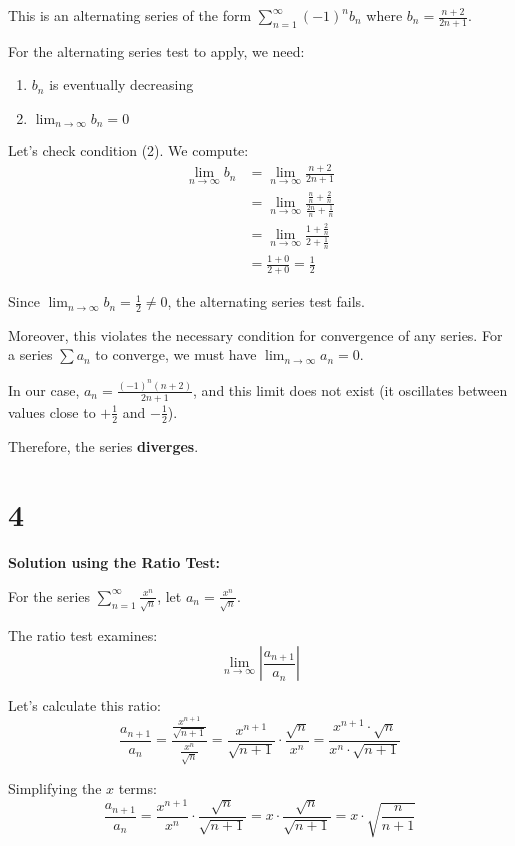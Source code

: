 \documentclass[12pt,a4paper]{article}
\theoremstyle{definition}
\theoremstyle{remark}
\begin{document}
This is an alternating series of the form $\sum_{n=1}^{\infty} (-1)^n b_n$ where $b_n = \frac{n+2}{2n+1}$.

For the alternating series test to apply, we need:
\begin{enumerate}
    \item $b_n$ is eventually decreasing
    \item $\lim_{n \to \infty} b_n = 0$
\end{enumerate}

Let's check condition (2). We compute:
\begin{align*}
    \lim_{n \to \infty} b_n &= \lim_{n \to \infty} \frac{n+2}{2n+1} \\
    &= \lim_{n \to \infty} \frac{\frac{n}{n} + \frac{2}{n}}{\frac{2n}{n} + \frac{1}{n}} \\
    &= \lim_{n \to \infty} \frac{1 + \frac{2}{n}}{2 + \frac{1}{n}} \\
    &= \frac{1 + 0}{2 + 0} = \frac{1}{2}
\end{align*}

Since $\lim_{n \to \infty} b_n = \frac{1}{2} \neq 0$, the alternating series test fails.

Moreover, this violates the necessary condition for convergence of any series. For a series $\sum a_n$ to converge, we must have $\lim_{n \to \infty} a_n = 0$.

In our case, $a_n = \frac{(-1)^n (n+2)}{2n+1}$, and this limit does not exist (it oscillates between values close to $+\frac{1}{2}$ and $-\frac{1}{2}$).

Therefore, the series \textbf{diverges}.


\section*{4}

\textbf{Solution using the Ratio Test:}

For the series $\sum_{n=1}^{\infty} \frac{x^n}{\sqrt{n}}$, let $a_n = \frac{x^n}{\sqrt{n}}$.

The ratio test examines:
$$\lim_{n \to \infty} \left|\frac{a_{n+1}}{a_n}\right|$$

Let's calculate this ratio:
$$\frac{a_{n+1}}{a_n} = \frac{\frac{x^{n+1}}{\sqrt{n+1}}}{\frac{x^n}{\sqrt{n}}} = \frac{x^{n+1}}{\sqrt{n+1}} \cdot \frac{\sqrt{n}}{x^n} = \frac{x^{n+1} \cdot \sqrt{n}}{x^n \cdot \sqrt{n+1}}$$

Simplifying the $x$ terms:
$$\frac{a_{n+1}}{a_n} = \frac{x^{n+1}}{x^n} \cdot \frac{\sqrt{n}}{\sqrt{n+1}} = x \cdot \frac{\sqrt{n}}{\sqrt{n+1}} = x \cdot \sqrt{\frac{n}{n+1}}$$
\end{document}
